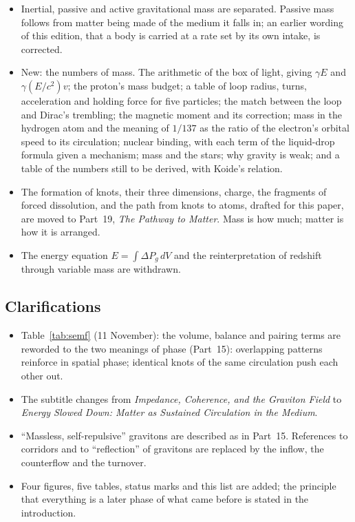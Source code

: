 \documentclass[11pt,a4paper]{article}
\begin{document}
\begin{itemize}
\item Inertial, passive and active gravitational mass are separated. Passive mass follows from matter being made of the medium it falls in; an earlier wording of this edition, that a body is carried at a rate set by its own intake, is corrected.
\item New: the numbers of mass. The arithmetic of the box of light, giving $\gamma E$ and $\gamma (E/c^2) v$; the proton's mass budget; a table of loop radius, turns, acceleration and holding force for five particles; the match between the loop and Dirac's trembling; the magnetic moment and its correction; mass in the hydrogen atom and the meaning of $1/137$ as the ratio of the electron's orbital speed to its circulation; nuclear binding, with each term of the liquid-drop formula given a mechanism; mass and the stars; why gravity is weak; and a table of the numbers still to be derived, with Koide's relation.
\item The formation of knots, their three dimensions, charge, the fragments of forced dissolution, and the path from knots to atoms, drafted for this paper, are moved to Part~19, \emph{The Pathway to Matter}. Mass is how much; matter is how it is arranged.
\item The energy equation $E = \int \Delta P_g\, dV$ and the reinterpretation of redshift through variable mass are withdrawn.
\end{itemize}

\subsection*{Clarifications}
\begin{itemize}
\item Table~\ref{tab:semf} (11 November): the volume, balance and pairing terms are reworded to the two meanings of phase (Part~15): overlapping patterns reinforce in spatial phase; identical knots of the same circulation push each other out.
\item The subtitle changes from \emph{Impedance, Coherence, and the Graviton Field} to \emph{Energy Slowed Down: Matter as Sustained Circulation in the Medium}.
\item ``Massless, self-repulsive'' gravitons are described as in Part~15. References to corridors and to ``reflection'' of gravitons are replaced by the inflow, the counterflow and the turnover.
\item Four figures, five tables, status marks and this list are added; the principle that everything is a later phase of what came before is stated in the introduction.
\end{itemize}

\newpage


\end{document}
